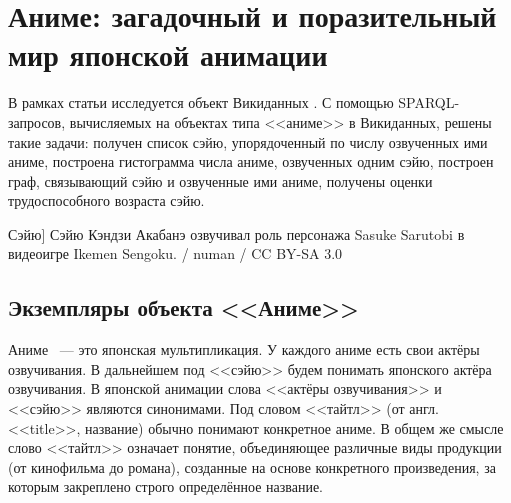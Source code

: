 
\chapter{Аниме: загадочный и поразительный мир японской анимации}


В рамках статьи исследуется объект Викиданных . С помощью SPARQL-запросов, вычисляемых на объектах типа <<аниме>> в Викиданных, решены такие задачи: получен список сэйю, упорядоченный по числу озвученных ими аниме, построена гистограмма числа аниме, озвученных одним сэйю, построен граф, связывающий сэйю и озвученные ими аниме, получены оценки трудоспособного возраста сэйю. 

\begin{marginfigure}[0.0cm]
{
	\setlength{\fboxsep}{0pt}%
	\setlength{\fboxrule}{1pt}%
}
\caption
[Сэйю]
{
Сэйю Кэндзи Акабанэ озвучивал роль персонажа Sasuke Sarutobi в видеоигре Ikemen Sengoku. / numan / CC BY-SA 3.0
}
\label{fig:seyu}
\end{marginfigure}

\label{ch:anime}

\section{Экземпляры объекта <<Аниме>>}

Аниме ~--- это японская мультипликация. У каждого аниме есть свои актёры озвучивания. В дальнейшем под <<сэйю>> будем понимать японского актёра озвучивания. В японской анимации слова <<актёры озвучивания>> и <<сэйю>> являются синонимами\cite{seiyu_def}. Под словом <<тайтл>> (от англ. <<title>>, название) обычно понимают конкретное аниме\cite{anime_social}. В общем же смысле слово <<тайтл>> означает понятие, объединяющее различные виды продукции (от кинофильма до романа), созданные на основе конкретного произведения, за которым закреплено строго определённое название\cite{anime_title_def}.

